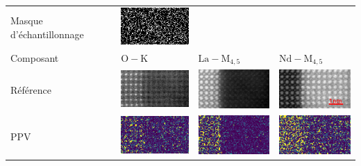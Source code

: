 \setlength{}

\begin{tabular}{m{2cm}*{3}{M{0.24\textwidth}}}
    Masque d'échantillonnage&
    \includegraphics[width=\tmplength]{img/chapitre4/figure9/img/mask.png}&
    &
    \\[30pt]
    Composant&
    {$\mathrm{O-K}$}&
    {$\mathrm{La-M}_{4, 5}$}&
    {$\mathrm{Nd-M}_{4, 5}$}\\
    Référence&
    \includegraphics[width=\tmplength]{img/chapitre4/figure7/HR2_GT_band_0.png}&
    \includegraphics[width=\tmplength]{img/chapitre4/figure7/HR2_GT_band_1.png}&
    \includegraphics[width=\tmplength]{img/chapitre4/figure7/HR2_GT_band_2.png}\\
    PPV&
    \includegraphics[width=\tmplength]{img/chapitre4/figure7/R2_NN_band_0.png}&
    \includegraphics[width=\tmplength]{img/chapitre4/figure7/R2_NN_band_1.png}&
    \includegraphics[width=\tmplength]{img/chapitre4/figure7/R2_NN_band_2.png}\\

\end{tabular}
